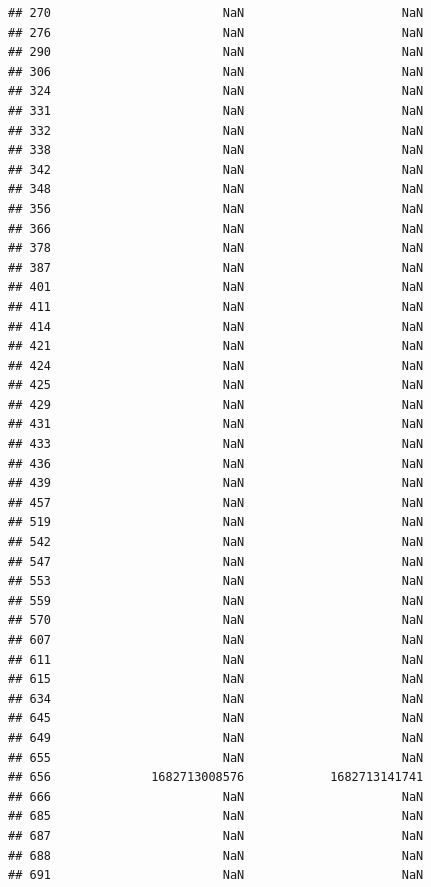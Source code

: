 \documentclass[
]{article}
\begin{document}
\begin{verbatim}
## 270                        NaN                      NaN
## 276                        NaN                      NaN
## 290                        NaN                      NaN
## 306                        NaN                      NaN
## 324                        NaN                      NaN
## 331                        NaN                      NaN
## 332                        NaN                      NaN
## 338                        NaN                      NaN
## 342                        NaN                      NaN
## 348                        NaN                      NaN
## 356                        NaN                      NaN
## 366                        NaN                      NaN
## 378                        NaN                      NaN
## 387                        NaN                      NaN
## 401                        NaN                      NaN
## 411                        NaN                      NaN
## 414                        NaN                      NaN
## 421                        NaN                      NaN
## 424                        NaN                      NaN
## 425                        NaN                      NaN
## 429                        NaN                      NaN
## 431                        NaN                      NaN
## 433                        NaN                      NaN
## 436                        NaN                      NaN
## 439                        NaN                      NaN
## 457                        NaN                      NaN
## 519                        NaN                      NaN
## 542                        NaN                      NaN
## 547                        NaN                      NaN
## 553                        NaN                      NaN
## 559                        NaN                      NaN
## 570                        NaN                      NaN
## 607                        NaN                      NaN
## 611                        NaN                      NaN
## 615                        NaN                      NaN
## 634                        NaN                      NaN
## 645                        NaN                      NaN
## 649                        NaN                      NaN
## 655                        NaN                      NaN
## 656              1682713008576            1682713141741
## 666                        NaN                      NaN
## 685                        NaN                      NaN
## 687                        NaN                      NaN
## 688                        NaN                      NaN
## 691                        NaN                      NaN

\end{verbatim}
\end{document}
